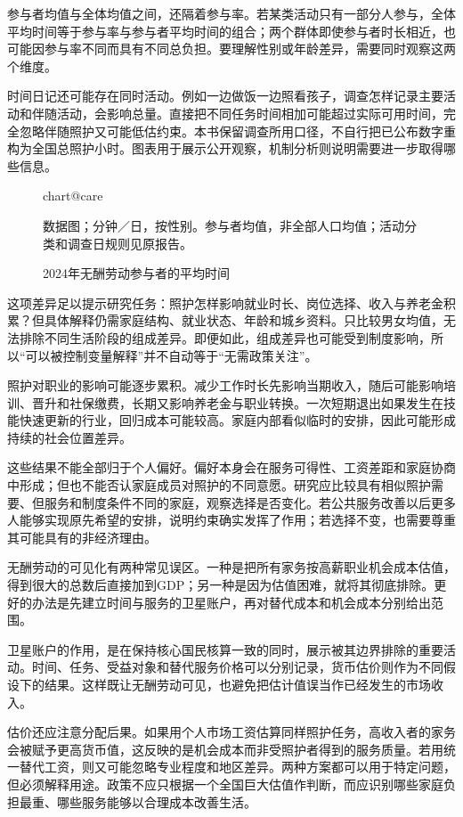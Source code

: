\documentclass[UTF8,fontset=fandol,zihao=-4,oneside,openany]{ctexbook}
\makeatletter
\newcommand{\Chart}[3]{\begin{figure}[htbp]\centering\csname chart@#1\endcsname\caption{#2}\par\small #3\end{figure}}
\makeatother
\begin{document}
\label{arg:P144}
参与者均值与全体均值之间，还隔着参与率。若某类活动只有一部分人参与，全体平均时间等于参与率与参与者平均时间的组合；两个群体即使参与者时长相近，也可能因参与率不同而具有不同总负担。要理解性别或年龄差异，需要同时观察这两个维度。

时间日记还可能存在同时活动。例如一边做饭一边照看孩子，调查怎样记录主要活动和伴随活动，会影响总量。直接把不同任务时间相加可能超过实际可用时间，完全忽略伴随照护又可能低估约束。本书保留调查所用口径，不自行把已公布数字重构为全国总照护小时。图表用于展示公开观察，机制分析则说明需要进一步取得哪些信息。

\Chart{care}{2024年无酬劳动参与者的平均时间}{数据图；分钟／日，按性别。参与者均值，非全部人口均值；活动分类和调查日规则见原报告。\cite{TimeUse2024}}

这项差异足以提示研究任务：照护怎样影响就业时长、岗位选择、收入与养老金积累？但具体解释仍需家庭结构、就业状态、年龄和城乡资料。只比较男女均值，无法排除不同生活阶段的组成差异。即便如此，组成差异也可能受到制度影响，所以“可以被控制变量解释”并不自动等于“无需政策关注”。

\label{arg:P145}
照护对职业的影响可能逐步累积。减少工作时长先影响当期收入，随后可能影响培训、晋升和社保缴费，长期又影响养老金与职业转换。一次短期退出如果发生在技能快速更新的行业，回归成本可能较高。家庭内部看似临时的安排，因此可能形成持续的社会位置差异。

这些结果不能全部归于个人偏好。偏好本身会在服务可得性、工资差距和家庭协商中形成；但也不能否认家庭成员对照护的不同意愿。研究应比较具有相似照护需要、但服务和制度条件不同的家庭，观察选择是否变化。若公共服务改善以后更多人能够实现原先希望的安排，说明约束确实发挥了作用；若选择不变，也需要尊重其可能具有的非经济理由。

无酬劳动的可见化有两种常见误区。一种是把所有家务按高薪职业机会成本估值，得到很大的总数后直接加到GDP；另一种是因为估值困难，就将其彻底排除。更好的办法是先建立时间与服务的卫星账户，再对替代成本和机会成本分别给出范围。

\label{arg:P146}
卫星账户的作用，是在保持核心国民核算一致的同时，展示被其边界排除的重要活动。时间、任务、受益对象和替代服务价格可以分别记录，货币估价则作为不同假设下的结果。这样既让无酬劳动可见，也避免把估计值误当作已经发生的市场收入。

估价还应注意分配后果。如果用个人市场工资估算同样照护任务，高收入者的家务会被赋予更高货币值，这反映的是机会成本而非受照护者得到的服务质量。若用统一替代工资，则又可能忽略专业程度和地区差异。两种方案都可以用于特定问题，但必须解释用途。政策不应只根据一个全国巨大估值作判断，而应识别哪些家庭负担最重、哪些服务能够以合理成本改善生活。
\end{document}
